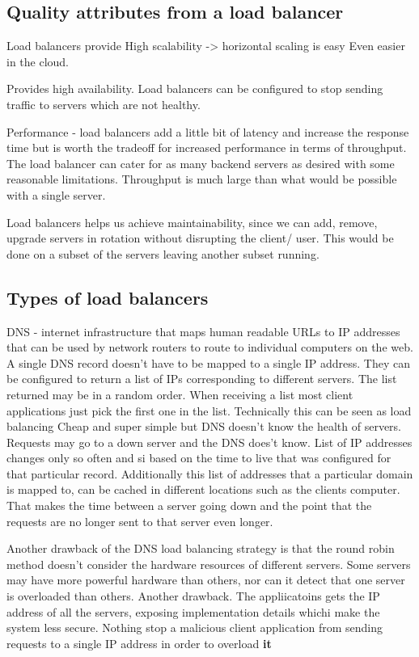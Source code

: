 \documentclass[a4paper, 11pt]{book}
\begin{document}
    \subsection{Quality attributes from a load balancer}
    Load balancers provide
    High scalability -> horizontal scaling is easy
    Even easier in the cloud.

    Provides high availability.
    Load balancers can be configured to stop sending traffic to servers which are not healthy.

    Performance - load balancers add a little bit of latency and increase the response time but is worth the tradeoff for increased performance in terms of throughput.
    The load balancer can cater for as many backend servers as desired with some reasonable limitations.
    Throughput is much large than what would be possible with a single server.

    Load balancers helps us achieve maintainability, since we can add, remove, upgrade servers in rotation without disrupting the client/ user.
    This would be done on a subset of the servers leaving another subset running.

    \subsection{Types of load balancers}
    DNS - internet infrastructure that maps human readable URLs to IP addresses that can be used by network routers to route to individual computers on the web.
    A single DNS record doesn't have to be mapped to a single IP address.
    They can be configured to return a list of IPs corresponding to different servers.
    The list returned may be in a random order.
    When receiving a list most client applications just pick the first one in the list.
    Technically this can be seen as load balancing
    Cheap and super simple but DNS doesn't know the health of servers.
    Requests may go to a down server and the DNS does't know.
    List of IP addresses changes only so often and si based on the time to live that was configured for that particular record.
    Additionally this list of addresses that a particular domain is mapped to, can be cached in different locations such as the clients computer.
    That makes the time between a server going down and the point that the requests are no longer sent to that server even longer.

    Another drawback of the DNS load balancing strategy is that the round robin method doesn't consider the hardware resources of different servers.
    Some servers may have more powerful hardware than others, nor can it detect that one server is overloaded than others.
    Another drawback.
    The appliicatoins gets the IP address of all the servers, exposing implementation details whichi make the system less secure.
    Nothing stop a malicious client application from sending requests to a single IP address in order to overload \textbf{it}
\end{document}
